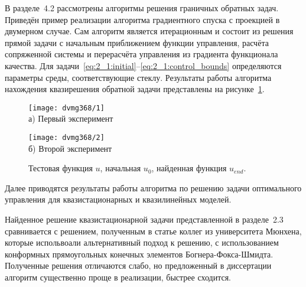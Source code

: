 В разделе~4.2 рассмотрены алгоритмы решения граничных обратных задач.
Приведён пример реализации алгоритма градиентного спуска с проекцией в двумерном случае.
Сам алгоритм является итерационным и состоит из решения прямой
задачи с начальным приближением функции управления,
расчёта сопряженной системы и перерасчёта управления из градиента функционала качества.
Для задачи~\eqref{eq:2_1:initial}--\eqref{eq:2_1:control_bounds}
определяются параметры среды, соответствующие стеклу.
Результаты работы алгоритма нахождения квазирешения обратной задачи
представлены на рисунке~\ref{fig:4_3:control}.
\begin{figure}[h!t]
    \begin{minipage}[b][][b]{0.49\linewidth}
        \centering
        \texttt{[image: dvmg368/1]} \\ а) Первый эксперимент
    \end{minipage}
    \hfill
    \begin{minipage}[b][][b]{0.49\linewidth}
        \centering
        \texttt{[image: dvmg368/2]} \\ б) Второй эксперимент
    \end{minipage}
    \caption{Тестовая функция $u$, начальная $u_0$, найденная функция $u_{end}.$}
    \label{fig:4_3:control}
\end{figure}

Далее приводятся результаты работы алгоритма по решению задачи оптимального
управления для квазистационарных и квазилинейных моделей.


Найденное решение квазистационарной задачи представленной в разделе~2.3
сравнивается с решением, полученным в статье коллег из университета Мюнхена,
которые испольвоали альтернативный подход к решению, с использованием
конформных прямоугольных конечных элементов
Богнера-Фокса-Шмидта.
Полученные решения отличаются слабо, но предложенный в диссертации алгоритм
существенно проще в реализации, быстрее сходится.


